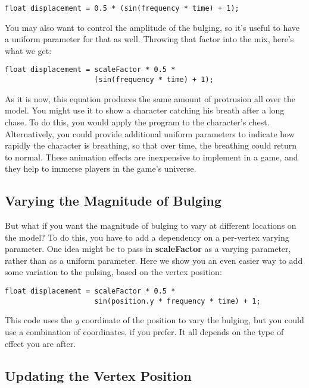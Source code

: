 \documentclass[../main.tex]{subfiles}
\begin{document}
\FloatBarrier
\begin{lstlisting}
float displacement = 0.5 * (sin(frequency * time) + 1);
\end{lstlisting}
\FloatBarrier

You may also want to control the amplitude of the bulging, so it's useful to have a uniform parameter for that as well. Throwing that factor into the mix, here's what we get:

\FloatBarrier
\begin{lstlisting}
float displacement = scaleFactor * 0.5 *
                     (sin(frequency * time) + 1);
\end{lstlisting}
\FloatBarrier

As it is now, this equation produces the same amount of protrusion all over the model. You might use it to show a character catching his breath after a long chase. To do this, you would apply the program to the character's chest. Alternatively, you could provide additional uniform parameters to indicate how rapidly the character is breathing, so that over time, the breathing could return to normal. These animation effects are inexpensive to implement in a game, and they help to immerse players in the game's universe.

\subsection*{Varying the Magnitude of Bulging}

But what if you want the magnitude of bulging to vary at different locations on the model? To do this, you have to add a dependency on a per-vertex varying parameter. One idea might be to pass in \textbf{scaleFactor} as a varying parameter, rather than as a uniform parameter. Here we show you an even easier way to add some variation to the pulsing, based on the vertex position:

\FloatBarrier
\begin{lstlisting}
float displacement = scaleFactor * 0.5 *
                     sin(position.y * frequency * time) + 1;
\end{lstlisting}
\FloatBarrier

This code uses the \textit{y} coordinate of the position to vary the bulging, but you could use a combination of coordinates, if you prefer. It all depends on the type of effect you are after.

\subsection*{Updating the Vertex Position}
\end{document}
